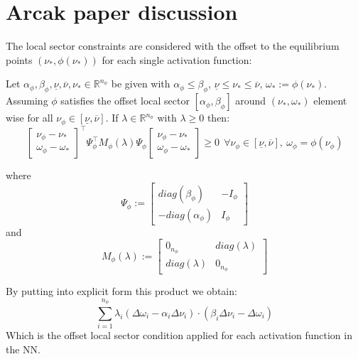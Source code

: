 \documentclass[12pt]{article}
\begin{document}
\section*{Arcak paper discussion}
The local sector constraints are considered with the offset to the equilibrium points $(\nu_*, \phi(\nu_*))$ for each single activation function:

Let $\alpha_{\phi}, \beta_{\phi}, \underline{\nu}, \overline{\nu}, \nu_* \in \mathbb{R}^{n_{\phi}}$ be given with $\alpha_{\phi} \leq \beta_{\phi}$, $\underline{\nu} \leq \nu_* \leq \overline{\nu}$, $\omega_* := \phi(\nu_*)$. Assuming $\phi$ satisfies the offset local sector $\left[ \alpha_{\phi}, \beta_{\phi} \right]$ around $(\nu_*, \omega_*)$ element wise for all $\nu_{\phi} \in [\underline{\nu}, \overline{\nu}]$. If $\lambda \in \mathbb{R}^{n_{\phi}}$ with $\lambda \geq 0$ then:
\begin{equation}
  \begin{bmatrix}
    \nu_{\phi} - \nu_*\\
    \omega_{\phi} - \omega_*
  \end{bmatrix}^{\top} \Psi_{\phi}^{\top} M_{\phi}(\lambda) \Psi_{\phi} \begin{bmatrix}
    \nu_{\phi} - \nu_*\\
    \omega_{\phi} - \omega_*
  \end{bmatrix} \geq 0\ \ \forall \nu_{\phi} \in [\underline{\nu}, \overline{\nu}],\ \omega_{\phi} = \phi(\nu_{\phi})
\end{equation}

where
$$
\Psi_{\phi} := \begin{bmatrix}
  \textit{diag}(\beta_{\phi}) & - I_{\phi}\\
  - \textit{diag}(\alpha_{\phi}) & I_{\phi}
\end{bmatrix}
$$
and
$$
M_{\phi} (\lambda) := \begin{bmatrix}
  0_{n_{\phi}} & \textit{diag} (\lambda)\\
  \textit{diag} (\lambda) &  0_{n_{\phi}}
\end{bmatrix}
$$

By putting into explicit form this product we obtain:
$$
  \sum_{i=1}^{n_{\phi}} \lambda_i \left( \Delta \omega_i - \alpha_i \Delta \nu_i \right) \cdot \left( \beta_i \Delta \nu_i - \Delta \omega_i \right)
$$
Which is the offset local sector condition applied for each activation function in the NN.
\end{document}
